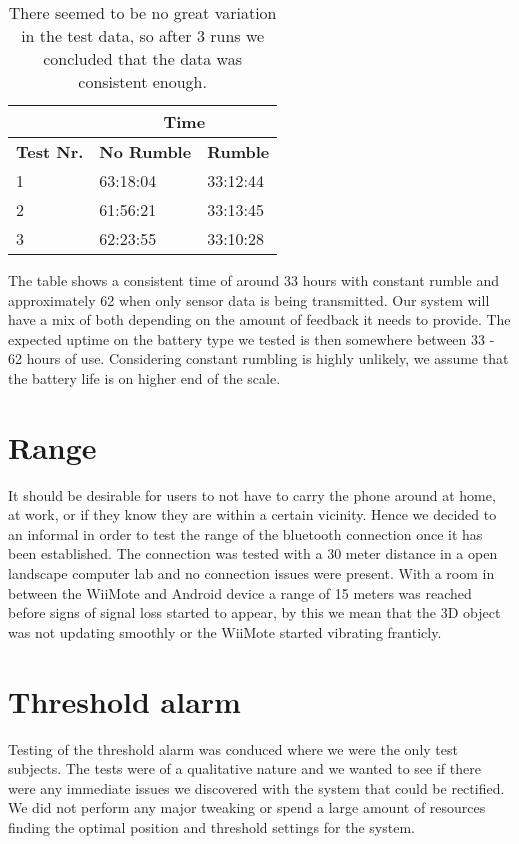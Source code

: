 \begin{table}[h]
\centering
\setlength{\extrarowheight}{0,2cm}
\begin{tabular}{p{2cm}|p{4.75cm}|p{4.75cm}|}
\cline{2-3}
&\multicolumn{2}{c|}{\textbf{Time}}\\ \hline
\textbf{Test Nr.} &\textbf{No Rumble} & \textbf{Rumble} \\ \hline
1 & 63:18:04 & 33:12:44 \\ \hline
2 & 61:56:21 & 33:13:45 \\ \hline
3 & 62:23:55 & 33:10:28 \\ \hline
\end{tabular}
\caption{There seemed to be no great variation in the test data, so after 3 runs we concluded that the data was consistent enough.}
\label{}
\end{table}

The table shows a consistent time of around 33 hours with constant rumble and approximately 62 when only sensor data is being transmitted. Our system will have a mix of both depending on the amount of feedback it needs to provide. The expected uptime on the battery type we tested is then somewhere between 33 - 62 hours of use. Considering constant rumbling is highly unlikely, we assume that the battery life is on higher end of the scale.

\section{Range}
It should be desirable for users to not have to carry the phone around at home, at work, or if they know they are within a certain vicinity. Hence we decided to an informal in order to test the range of the bluetooth connection once it has been established. The connection was tested with a 30 meter distance in a open landscape computer lab and no connection issues were present. With a room in between the WiiMote and Android device a range of 15 meters was reached before signs of signal loss started to appear, by this we mean that the 3D object was not updating smoothly or the WiiMote started vibrating franticly.

\section{Threshold alarm}
Testing of the threshold alarm was conduced where we were the only test subjects. The tests were of a qualitative nature and we wanted to see if there were any immediate issues we discovered with the system that could be rectified. We did not perform any major tweaking or spend a large amount of resources finding the optimal position and threshold settings for the system. 

